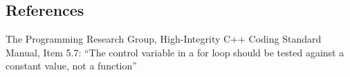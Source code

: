 \subsection{References}

The Programming Research Group, High-Integrity C++ Coding Standard Manual, Item 5.7: ``The control variable in a for loop should be tested against a constant value, not a function''

